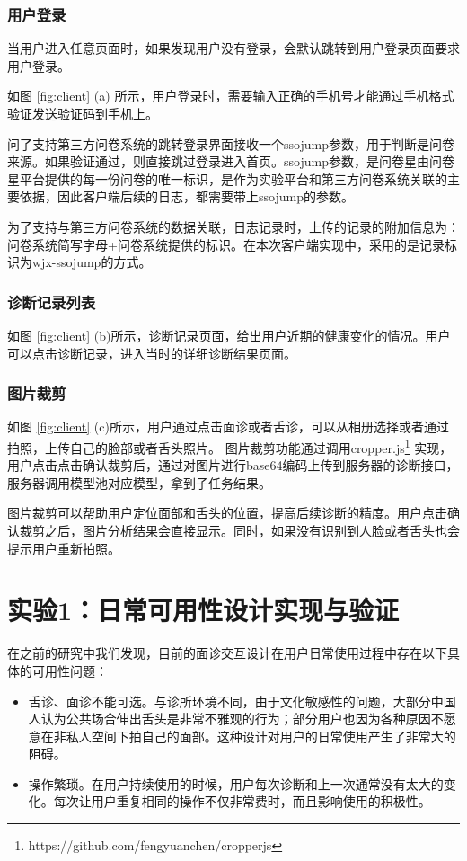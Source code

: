 \subsubsection{用户登录}

当用户进入任意页面时，如果发现用户没有登录，会默认跳转到用户登录页面要求用户登录。

如图 \ref{fig:client} (a) 所示，用户登录时，需要输入正确的手机号才能通过手机格式验证发送验证码到手机上。

问了支持第三方问卷系统的跳转登录界面接收一个ssojump参数，用于判断是问卷来源。如果验证通过，则直接跳过登录进入首页。ssojump参数，是问卷星由问卷星平台提供的每一份问卷的唯一标识，是作为实验平台和第三方问卷系统关联的主要依据，因此客户端后续的日志，都需要带上ssojump的参数。

为了支持与第三方问卷系统的数据关联，日志记录时，上传的记录的附加信息为：问卷系统简写字母+问卷系统提供的标识。在本次客户端实现中，采用的是记录标识为wjx-ssojump的方式。

\subsubsection{诊断记录列表}

如图 \ref{fig:client} (b)所示，诊断记录页面，给出用户近期的健康变化的情况。用户可以点击诊断记录，进入当时的详细诊断结果页面。

\subsubsection{图片裁剪}

如图 \ref{fig:client} (c)所示，用户通过点击面诊或者舌诊，可以从相册选择或者通过拍照，上传自己的脸部或者舌头照片。
图片裁剪功能通过调用cropper.js\footnote{https://github.com/fengyuanchen/cropperjs} 实现，用户点击点击确认裁剪后，通过对图片进行base64编码上传到服务器的诊断接口，服务器调用模型池对应模型，拿到子任务结果。

图片裁剪可以帮助用户定位面部和舌头的位置，提高后续诊断的精度。用户点击确认裁剪之后，图片分析结果会直接显示。同时，如果没有识别到人脸或者舌头也会提示用户重新拍照。


\section{实验1：日常可用性设计实现与验证}


在之前的研究中我们发现，目前的面诊交互设计在用户日常使用过程中存在以下具体的可用性问题：
\begin{itemize}
    \item 舌诊、面诊不能可选。与诊所环境不同，由于文化敏感性的问题，大部分中国人认为公共场合伸出舌头是非常不雅观的行为；部分用户也因为各种原因不愿意在非私人空间下拍自己的面部。这种设计对用户的日常使用产生了非常大的阻碍。
    \item 操作繁琐。在用户持续使用的时候，用户每次诊断和上一次通常没有太大的变化。每次让用户重复相同的操作不仅非常费时，而且影响使用的积极性。
\end{itemize}

